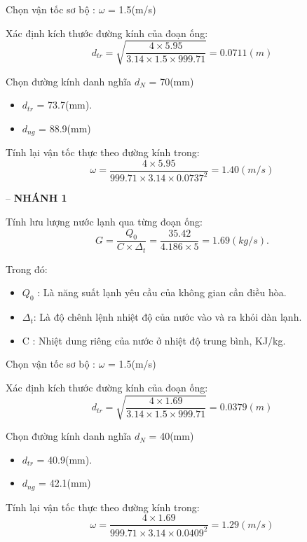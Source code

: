 Chọn vận tốc sơ bộ : $\omega$ = 1.5(m/s)

Xác định kích thước đường kính của đoạn ống:
\begin{equation*}
	d_{tr} = \sqrt{\dfrac{4 \times 5.95}{3.14 \times 1.5 \times 999.71}} = 0.0711(m)
\end{equation*}

Chọn đường kính danh nghĩa $d_{N}$ = 70(mm)
\begin{itemize}
	\item $d_{tr}$ = 73.7(mm).
	\item $d_{ng}$ = 88.9(mm)
\end{itemize}

Tính lại vận tốc thực theo đường kính trong:
\begin{equation*}
	\omega = \dfrac{4 \times 5.95 }{999.71 \times 3.14 \times 0.0737^{2}} = 1.40(m/s)
\end{equation*}

-- \textbf{NHÁNH 1}

Tính lưu lượng nước lạnh qua từng đoạn ống:
\begin{equation*}
	G = \dfrac{Q_{0}}{C \times \Delta_{t}} =\dfrac{35.42}{4.186 \times 5} = 1.69(kg/s).
\end{equation*}

Trong đó:
\begin{itemize}
	\item $Q_{0}$ : Là năng suất lạnh yêu cầu của không gian cần điều hòa.
	\item $\Delta_{t}$: Là độ chênh lệnh nhiệt độ của nước vào và ra khỏi dàn lạnh.
	\item C : Nhiệt dung riêng của nước ở nhiệt độ trung bình, KJ/kg.
\end{itemize}

Chọn vận tốc sơ bộ : $\omega$ = 1.5(m/s)

Xác định kích thước đường kính của đoạn ống:
\begin{equation*}
	d_{tr} = \sqrt{\dfrac{4 \times 1.69}{3.14 \times 1.5 \times 999.71}} = 0.0379(m)
\end{equation*}

Chọn đường kính danh nghĩa $d_{N}$ = 40(mm)
\begin{itemize}
	\item $d_{tr}$ = 40.9(mm).
	\item $d_{ng}$ = 42.1(mm)
\end{itemize}

Tính lại vận tốc thực theo đường kính trong:
\begin{equation*}
	\omega = \dfrac{4 \times 1.69 }{999.71 \times 3.14 \times 0.0409^{2}} = 1.29(m/s)
\end{equation*}

